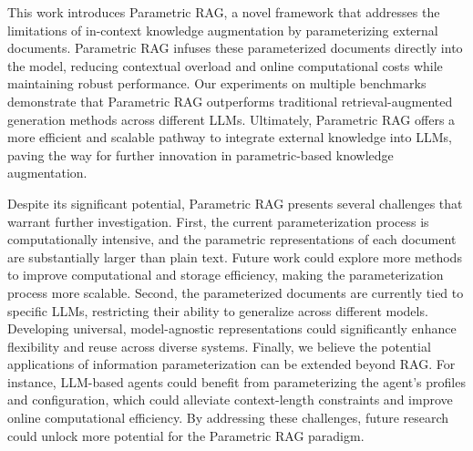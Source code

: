 \documentclass[sigconf,natbib=true,anonymous=false]{acmart}
\begin{document}
This work introduces Parametric RAG, a novel framework that addresses the limitations of in-context knowledge augmentation by parameterizing external documents. Parametric RAG infuses these parameterized documents directly into the model, reducing contextual overload and online computational costs while maintaining robust performance. 
Our experiments on multiple benchmarks demonstrate that Parametric RAG outperforms traditional retrieval-augmented generation methods across different LLMs. 
Ultimately, Parametric RAG offers a more efficient and scalable pathway to integrate external knowledge into LLMs, paving the way for further innovation in parametric-based knowledge augmentation.

Despite its significant potential, Parametric RAG presents several challenges that warrant further investigation. First, the current parameterization process is computationally intensive, and the parametric representations of each document are substantially larger than plain text. Future work could explore more methods to improve computational and storage efficiency, making the parameterization process more scalable. Second, the parameterized documents are currently tied to specific LLMs, restricting their ability to generalize across different models. Developing universal, model-agnostic representations could significantly enhance flexibility and reuse across diverse systems. 
Finally, we believe the potential applications of information parameterization can be extended beyond RAG. 
For instance, LLM-based agents could benefit from parameterizing the agent’s profiles and configuration, which could alleviate context-length constraints and improve online computational efficiency.
By addressing these challenges, future research could unlock more potential for the Parametric RAG paradigm.






\end{document}
